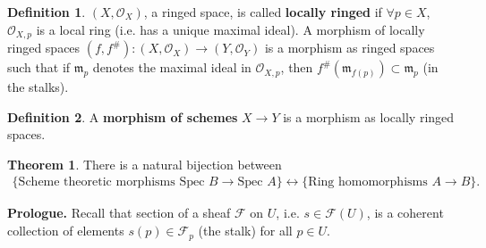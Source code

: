 \documentclass{article}
\theoremstyle{definition}
\newtheorem{theorem}{Theorem}[section]
\newtheorem{defn}{Definition}[section]
\begin{document}
\begin{defn}
    $(X,\mathcal{O}_X)$, a ringed space, is called \textbf{locally ringed} if $\forall p \in X$, $\mathcal{O}_{X,p}$ is a local ring (i.e. has a unique maximal ideal). A morphism of locally ringed spaces $(f,f^\#) : (X, \mathcal{O}_X) \to (Y, \mathcal{O}_Y)$ is a morphism as ringed spaces such that if $\mathfrak{m}_p$ denotes the maximal ideal in $\mathcal{O}_{X,p}$, then $f^\#(\mathfrak{m}_{f(p)}) \subset \mathfrak{m}_{p}$ (in the stalks). 
\end{defn}
\begin{defn}
    A \textbf{morphism of schemes} $X \to Y$ is a morphism as locally ringed spaces.
\end{defn}
\begin{theorem}
    There is a natural bijection between 
    \begin{align*}
        \{\text{Scheme theoretic morphisms }\text{Spec }B \to \text{Spec }A\} \leftrightarrow \{\text{Ring homomorphisms }A \to B\}.
    \end{align*}
\end{theorem}
\textbf{Prologue.} Recall that section of a sheaf $\mathcal{F}$ on $U$, i.e. $s \in \mathcal{F}(U)$, is a coherent collection of elements $s(p) \in \mathcal{F}_p$ (the stalk) for all $p \in U$.
\end{document}
